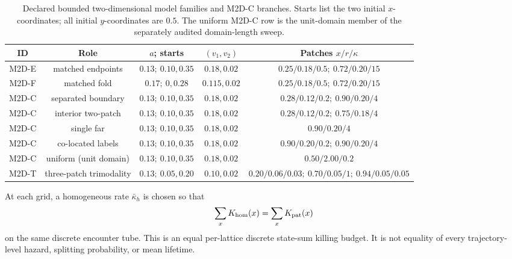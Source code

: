 \documentclass[aps,pre,reprint,amsmath,amssymb,longbibliography,floatfix]{revtex4-2}
\begin{document}
\begin{table}[!t]
\caption{\label{tab:2d-families}Declared bounded two-dimensional model families
and M2D-C branches. Starts list the two initial $x$-coordinates; all initial
$y$-coordinates are $0.5$. The uniform M2D-C row is the unit-domain member of
the separately audited domain-length sweep.}
\begin{ruledtabular}
\begin{tabular}{ccccc}
ID & Role & $a$; starts & $(v_1,v_2)$ & Patches $x/r/\kappa$\\
\hline
M2D-E & matched endpoints & $0.13;\ 0.10,0.35$ & $0.18,0.02$
& $0.25/0.18/0.5;\ 0.72/0.20/15$\\
M2D-F & matched fold & $0.17;\ 0,0.28$ & $0.115,0.02$
& $0.25/0.18/0.5;\ 0.72/0.20/15$\\
M2D-C & separated boundary & $0.13;\ 0.10,0.35$ & $0.18,0.02$
& $0.28/0.12/0.2;\ 0.90/0.20/4$\\
M2D-C & interior two-patch & $0.13;\ 0.10,0.35$ & $0.18,0.02$
& $0.28/0.12/0.2;\ 0.75/0.18/4$\\
M2D-C & single far & $0.13;\ 0.10,0.35$ & $0.18,0.02$
& $0.90/0.20/4$\\
M2D-C & co-located labels & $0.13;\ 0.10,0.35$ & $0.18,0.02$
& $0.90/0.20/0.2;\ 0.90/0.20/4$\\
M2D-C & uniform (unit domain) & $0.13;\ 0.10,0.35$ & $0.18,0.02$
& $0.50/2.00/0.2$\\
M2D-T & three-patch trimodality & $0.13;\ 0.05,0.20$ & $0.10,0.02$
& $0.20/0.06/0.03;\ 0.70/0.05/1;\ 0.94/0.05/0.05$
\end{tabular}
\end{ruledtabular}
\end{table}

At each grid, a homogeneous rate \(\bar\kappa_h\) is chosen so that
\begin{equation}
\sum_x K_{\rm hom}(x)=\sum_x K_{\rm pat}(x)
\label{eq:budget-match}
\end{equation}
on the same discrete encounter tube. This is an equal per-lattice discrete
state-sum killing budget. It is not equality of every trajectory-level hazard, splitting
probability, or mean lifetime.
\end{document}
